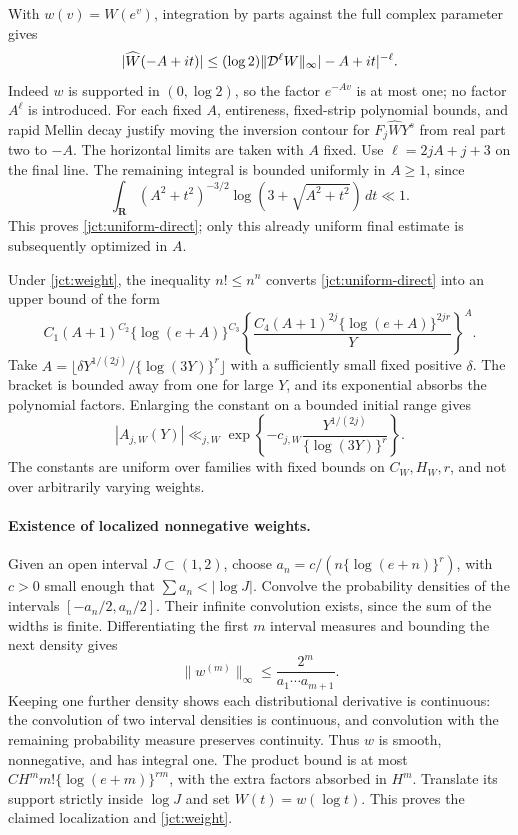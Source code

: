 With \(w(v)=W(e^v)\), integration by parts against the full
complex parameter gives
\begin{equation}
 |\widehat W(-A+it)|\le(\log2)
 \|\mathcal D^\ell W\|_\infty|-A+it|^{-\ell}.
 \label{jct:weight-mellin}
\end{equation}
Indeed \(w\) is supported in \((0,\log2)\), so the factor
\(e^{-Av}\) is at most one; no factor \(A^\ell\) is introduced.
For each fixed \(A\), entireness, fixed-strip polynomial bounds,
and rapid Mellin decay justify moving the inversion contour for
\(F_j\widehat W Y^s\) from real part two to \(-A\).
The horizontal limits are taken with \(A\) fixed.
Use \(\ell=2jA+j+3\) on the final line.
The remaining integral is bounded uniformly in \(A\ge1\), since
\[
 \int_{\mathbf R}(A^2+t^2)^{-3/2}
 \log(3+\sqrt{A^2+t^2})\,dt\ll1.
\]
This proves \eqref{jct:uniform-direct}; only this already uniform
final estimate is subsequently optimized in \(A\).

Under \eqref{jct:weight}, the inequality \(n!\le n^n\) converts
\eqref{jct:uniform-direct} into an upper bound of the form
\[
 C_1(A+1)^{C_2}\{\log(e+A)\}^{C_3}
 \left\{\frac{C_4(A+1)^{2j}\{\log(e+A)\}^{2jr}}Y\right\}^A.
\]
Take
\(A=\lfloor\delta Y^{1/(2j)}/\{\log(3Y)\}^r\rfloor\)
with a sufficiently small fixed positive \(\delta\).
The bracket is bounded away from one for large \(Y\), and its
exponential absorbs the polynomial factors.  Enlarging the
constant on a bounded initial range gives
\begin{equation}
 |A_{j,W}(Y)|\ll_{j,W}
 \exp\left\{-c_{j,W}\frac{Y^{1/(2j)}}{\{\log(3Y)\}^r}\right\}.
 \label{jct:direct-decay}
\end{equation}
The constants are uniform over families with fixed bounds on
\(C_W,H_W,r\), and not over arbitrarily varying weights.

\paragraph{Existence of localized nonnegative weights.}
Given an open interval \(J\subset(1,2)\), choose
\(a_n=c/(n\{\log(e+n)\}^r)\), with \(c>0\) small enough
that \(\sum a_n<|\log J|\).  Convolve the probability densities
of the intervals \([-a_n/2,a_n/2]\).
Their infinite convolution exists, since the sum of the widths
is finite.  Differentiating the first \(m\) interval measures
and bounding the next density gives
\[
 \|w^{(m)}\|_\infty\le\frac{2^m}{a_1\cdots a_{m+1}}.
\]
Keeping one further density shows each distributional derivative
is continuous: the convolution of two interval densities is
continuous, and convolution with the remaining probability
measure preserves continuity.  Thus \(w\) is smooth,
nonnegative, and has integral one.  The product bound is at most
\(CH^m m!\{\log(e+m)\}^{rm}\), with the extra factors absorbed
in \(H^m\).  Translate its support strictly inside \(\log J\)
and set \(W(t)=w(\log t)\).  This proves the claimed localization
and \eqref{jct:weight}.

